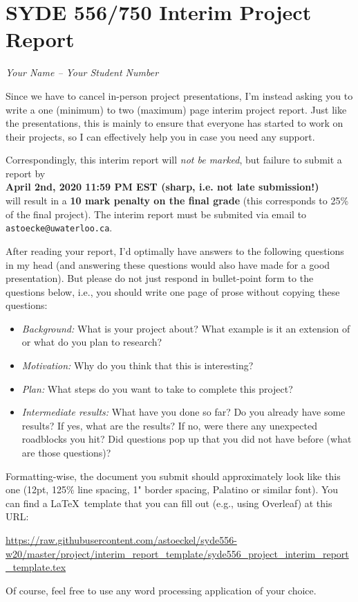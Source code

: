 \documentclass[12pt,letterpaper,oneside]{article}
\begin{document}
	\section*{SYDE 556/750 Interim Project Report}

	\emph{Your Name -- Your Student Number}

	Since we have to cancel in-person project presentations, I'm instead asking you to write a one (minimum) to two (maximum) page interim project report. Just like the presentations, this is mainly to ensure that everyone has started to work on their projects, so I can effectively help you in case you need any support.

	Correspondingly, this interim report will \emph{not be marked}, but failure to submit a report by\\[0.25cm]
	{\centering\bf April 2nd, 2020 11:59 PM EST (sharp, i.e. not late submission!)\\[0.25cm]}
	will result in a \textbf{10 mark penalty on the final grade} (this corresponds to 25\% of the final project). The interim report must be submited via email to \texttt{astoecke@uwaterloo.ca}.

	After reading your report, I'd optimally have answers to the following questions in my head (and answering these questions would also have made for a good presentation). But please do not just respond in bullet-point form to the questions below, i.e., you should write one page of prose without copying these questions:
	\begin{itemize}
		\item \emph{Background:} What is your project about? What example is it an extension of or what do you plan to research?
		\item \emph{Motivation:} Why do you think that this is interesting?
		\item \emph{Plan:} What steps do you want to take to complete this project?
		\item \emph{Intermediate results:} What have you done so far? Do you already have some results? If yes, what are the results? If no, were there any unexpected roadblocks you hit? Did questions pop up that you did not have before (what are those questions)?
	\end{itemize}

	Formatting-wise, the document you submit should approximately look like this one (12pt, 125\% line spacing, 1" border spacing, Palatino or similar font). You can find a \LaTeX\ template that you can fill out (e.g., using Overleaf) at this URL:
	\begin{center}
		\small
		\url{https://raw.githubusercontent.com/astoeckel/syde556-w20/master/project/interim_report_template/syde556_project_interim_report_template.tex}
	\end{center}

	Of course, feel free to use any word processing application of your choice.
\end{document}
